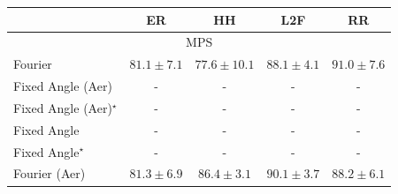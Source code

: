 \begin{tabular}{l|cccc|}
\toprule
            & ER & HH & L2F & RR \\
\midrule
\multicolumn{5}{c}{\rule{0pt}{8pt}MPS} \\
\midrule
Fourier & {\cellcolor[HTML]{FFEFAA}} \color[HTML]{000000} $81.1\pm 7.1$ & {\cellcolor[HTML]{FFFFE5}} \color[HTML]{000000} $77.6\pm 10.1$ & {\cellcolor[HTML]{FA8F24}} \color[HTML]{F1F1F1} $88.1\pm 4.1$ & {\cellcolor[HTML]{DF620D}} \color[HTML]{F1F1F1} $91.0\pm 7.6$ \\
Fixed Angle (Aer) & {\cellcolor[HTML]{000000}} \color[HTML]{F1F1F1} {\cellcolor{white}} \color{black} - & {\cellcolor[HTML]{000000}} \color[HTML]{F1F1F1} {\cellcolor{white}} \color{black} - & {\cellcolor[HTML]{000000}} \color[HTML]{F1F1F1} {\cellcolor{white}} \color{black} - & {\cellcolor[HTML]{000000}} \color[HTML]{F1F1F1} {\cellcolor{white}} \color{black} - \\
Fixed Angle (Aer)$^\star$ & {\cellcolor[HTML]{000000}} \color[HTML]{F1F1F1} {\cellcolor{white}} \color{black} - & {\cellcolor[HTML]{000000}} \color[HTML]{F1F1F1} {\cellcolor{white}} \color{black} - & {\cellcolor[HTML]{000000}} \color[HTML]{F1F1F1} {\cellcolor{white}} \color{black} - & {\cellcolor[HTML]{000000}} \color[HTML]{F1F1F1} {\cellcolor{white}} \color{black} - \\
Fixed Angle & {\cellcolor[HTML]{000000}} \color[HTML]{F1F1F1} {\cellcolor{white}} \color{black} - & {\cellcolor[HTML]{000000}} \color[HTML]{F1F1F1} {\cellcolor{white}} \color{black} - & {\cellcolor[HTML]{000000}} \color[HTML]{F1F1F1} {\cellcolor{white}} \color{black} - & {\cellcolor[HTML]{000000}} \color[HTML]{F1F1F1} {\cellcolor{white}} \color{black} - \\
Fixed Angle$^\star$ & {\cellcolor[HTML]{000000}} \color[HTML]{F1F1F1} {\cellcolor{white}} \color{black} - & {\cellcolor[HTML]{000000}} \color[HTML]{F1F1F1} {\cellcolor{white}} \color{black} - & {\cellcolor[HTML]{000000}} \color[HTML]{F1F1F1} {\cellcolor{white}} \color{black} - & {\cellcolor[HTML]{000000}} \color[HTML]{F1F1F1} {\cellcolor{white}} \color{black} - \\
Fourier (Aer) & {\cellcolor[HTML]{FFEEA8}} \color[HTML]{000000} $81.3\pm 6.9$ & {\cellcolor[HTML]{FEAD3A}} \color[HTML]{000000} $86.4\pm 3.1$ & {\cellcolor[HTML]{EB6F14}} \color[HTML]{F1F1F1} $90.1\pm 3.7$ & {\cellcolor[HTML]{F98E23}} \color[HTML]{F1F1F1} $88.2\pm 6.1$ \\

\end{tabular}
